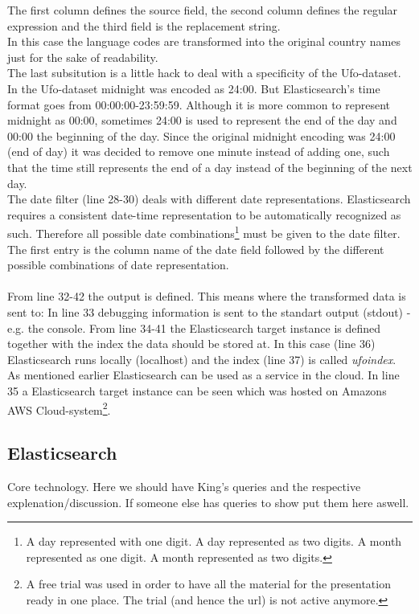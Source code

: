 \documentclass[bibliography=totoc]{article}
\begin{document}
The first column defines the source field, the second column defines the regular expression
and the third field is the replacement string.
\\
In this case the language codes are transformed into the original country names
just for the sake of readability.
\\
The last subsitution is a little hack to deal with a specificity of the Ufo-dataset.
In the Ufo-dataset midnight was encoded as 24:00. But Elasticsearch's time format goes from
00:00:00-23:59:59. Although it is more common to represent midnight as 00:00, sometimes
24:00 is used to represent the end of the day and 00:00 the beginning of the day.
Since the original midnight encoding was 24:00 (end of day) it was decided to 
remove one minute instead of adding one, such that the time still represents the end 
of a day instead of the beginning of the next day.
\\
The date filter (line 28-30) deals with different date representations.
Elasticsearch requires a consistent date-time representation to be automatically
recognized as such. Therefore all possible date combinations\footnote{A day represented with one digit. A day represented as two digits. A month represented as one digit. A month represented as two digits.} must be 
given to the date filter.
The first entry is the column name of the date field followed by the 
different possible combinations of date representation.
\\
\\
From line 32-42 the output is defined. This means where the transformed data is 
sent to:
In line 33 debugging information is sent to the standart output (stdout) - e.g. the console.
From line 34-41 the Elasticsearch target instance is defined together with the 
index the data should be stored at. In this case (line 36) Elasticsearch
runs locally (localhost) and the index (line 37) is called \textit{ufoindex}.
\\
As mentioned earlier Elasticsearch can be used as a service in the cloud. In line 
35 a Elasticsearch target instance can be seen which was hosted on Amazons AWS Cloud-system\footnote{A free trial was used in order to have all the material for the presentation ready in one place. The trial (and hence the url) is not active anymore.}.

\subsection{Elasticsearch}
Core technology. Here we should have King's queries and the respective explenation/discussion.
If someone else has queries to show put them here aswell.
\end{document}

